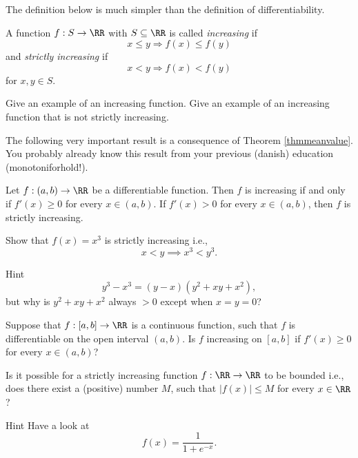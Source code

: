 \documentclass{article}
\begin{document}
The definition below is much simpler than the definition of differentiability.

\begin{definition}[emph]
A function $f:S\rightarrow \RR$ with $S\subseteq \RR$ is called
  \emph{increasing} if
  \begin{equation*}
    x\leq y\Rightarrow f(x) \leq f(y)
  \end{equation*}
  and \emph{strictly increasing} if 
  \begin{equation*}
    x< y\Rightarrow f(x) < f(y)
  \end{equation*}
  for $x, y\in S$.
\end{definition}

\beginshex
Give an example of an increasing function.
Give an example of an increasing function that is not strictly increasing.
\endshex

The following very important result is a consequence of Theorem \ref{thmmeanvalue}. You probably already know this result from your previous (danish) education (monotoniforhold!).

\begin{proposition}[emph]
  Let $f : (a, b)\rightarrow \RR$ be a differentiable function.
  Then
  $f$ is increasing if and only if $f'(x)\geq 0$ for every $x\in (a,
  b)$.  If $f'(x)> 0$ for every $x\in (a, b)$, then $f$ is strictly
  increasing.
\end{proposition}


\beginshex
Show that $f(x) = x^3$ is strictly increasing i.e., 
$$
x < y \implies x^3 < y^3.
$$
\begin{hideinbutton}{Hint}
$$
y^3 - x^3 = (y - x) (y^2 + x y + x^2),
$$
but why is $y^2 + x y + x^2$ always $> 0$ except when $x = y = 0$?
\end{hideinbutton}
\endshex


\beginshex
Suppose that $f: [a, b] \rightarrow \RR$ is a continuous function, such that
$f$ is differentiable on the open interval $(a, b)$. Is $f$ increasing
on $[a, b]$ if $f'(x)\geq 0$ for every $x\in (a, b)$?
\endshex

\beginshex
Is it possible for a strictly increasing function $f: \RR \rightarrow \RR$ to be bounded i.e., does
there exist a (positive) number $M$, such that $|f(x)| \leq M$ for every $x\in \RR$?

\begin{hideinbutton}{Hint}
  Have a look at
  $$
  f(x) = \dfrac{1}{1 + e^{-x}}.
  $$
  
\end{hideinbutton}
\endshex
\end{document}
